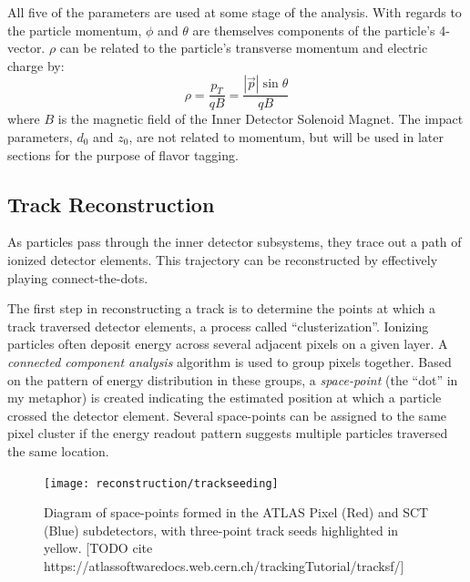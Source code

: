             All five of the parameters are used at some stage of the analysis.
            With regards to the particle momentum, $\phi$ and $\theta$ are themselves components of the particle's 4-vector.
            $\rho$ can be related to the particle's transverse momentum and electric charge by:
            \begin{equation}
                \rho = \frac{p_T}{qB} = \frac{|\vec{p}| \sin \theta}{qB}
            \end{equation}
            where $B$ is the magnetic field of the Inner Detector Solenoid Magnet\cite{thesis_track_sim_and_reco}.
            The impact parameters, $d_0$ and $z_0$, are not related to momentum,
                but will be used in later sections for the purpose of flavor tagging.

        \FloatBarrier
        \subsection{Track Reconstruction}

            As particles pass through the inner detector subsystems, they trace out a path of ionized detector elements.
            This trajectory can be reconstructed by effectively playing connect-the-dots.

            The first step in reconstructing a track is to determine the points at which a track traversed detector elements,
                a process called ``clusterization''\cite{atlas_track_reco_performance}.
            Ionizing particles often deposit energy across several adjacent pixels on a given layer.
            A \textit{connected component analysis} algorithm\cite{connected_component_analysis}
                is used to group pixels together.
            Based on the pattern of energy distribution in these groups,
                a \textit{space-point} (the ``dot'' in my metaphor) 
                is created indicating the estimated position at which a particle crossed the detector element.
            Several space-points can be assigned to the same pixel cluster
                if the energy readout pattern suggests multiple particles traversed the same location.

            \begin{figure}[tbh]
                \texttt{[image: reconstruction/trackseeding]}
                \caption{
                    Diagram of space-points formed in the ATLAS Pixel (Red) and SCT (Blue) subdetectors,
                        with three-point track seeds highlighted in yellow.
                        [TODO cite https://atlassoftwaredocs.web.cern.ch/trackingTutorial/tracksf/]
                }
                \label{fig:track_fit}
            \end{figure}

